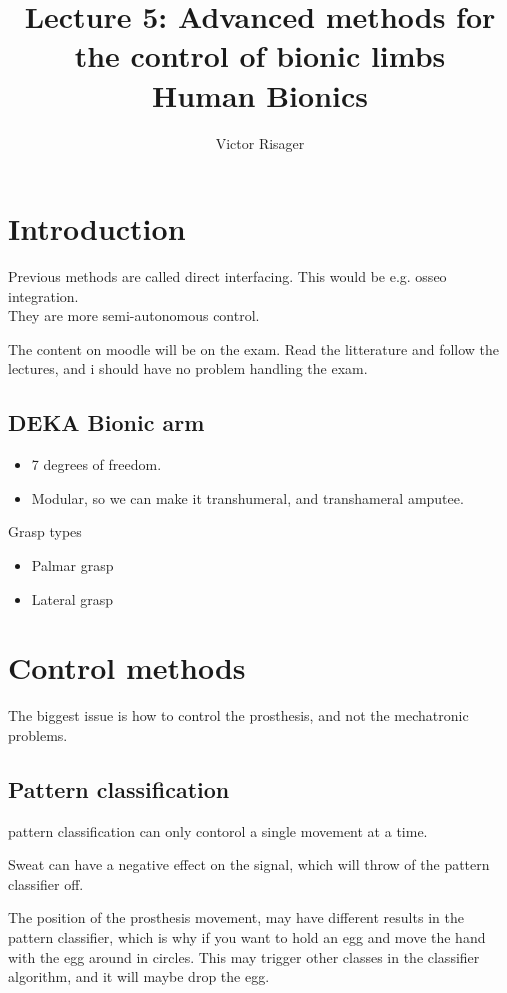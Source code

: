 \documentclass[a4paper]{article}
\title{Lecture 5: Advanced methods for the control of bionic limbs  \\
	\large Human Bionics}
\author{Victor Risager}
\begin{document}
\maketitle

\section{Introduction}
Previous methods are called direct interfacing. This would be e.g. osseo integration. \\ 
They are more semi-autonomous control. 


The content on moodle will be on the exam. Read the litterature and follow the lectures, and i should have no problem handling the exam. 

\subsection{DEKA Bionic arm}
\begin{itemize}
	\item 7 degrees of freedom. 
	\item Modular, so we can make it transhumeral, and transhameral amputee. 
\end{itemize}

Grasp types
\begin{itemize}
	\item Palmar grasp
	\item Lateral grasp
\end{itemize}

\section{Control methods}
The biggest issue is how to control the prosthesis, and not the mechatronic problems. 
\subsection{Pattern classification}
pattern classification can only contorol a single movement at a time. 

Sweat can have a negative effect on the signal, which will throw of the pattern classifier off. 

The position of the prosthesis movement, may have different results in the pattern classifier, which is why if you want to hold an egg and move the hand with the egg around in circles. This may trigger other classes in the classifier algorithm, and it will maybe drop the egg.
\end{document}
